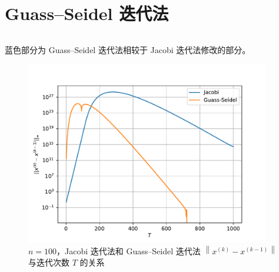 \documentclass{sjtuarticle}
\begin{document}
\section{Guass--Seidel 迭代法}
\label{sec:gs}

\inputminted[firstline=186,lastline=211,highlightlines=201-204]{python3}{main.py}
蓝色部分为 Guass--Seidel 迭代法相较于 Jacobi 迭代法修改的部分。

\begin{figure}[b]
    \centering
    \includegraphics[height=8cm]{pic/iter.pdf}
    \caption{$n=100$，Jacobi 迭代法和 Guass--Seidel 迭代法 $\left\lVert x^{(k)}-x^{(k-1)}\right\rVert$ 与迭代次数 $T$ 的关系}
    \label{fig:iter}
\end{figure}
\end{document}
